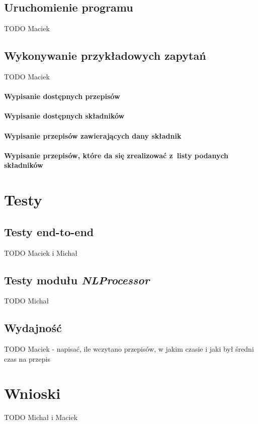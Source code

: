 \documentclass[11pt,a4paper]{article}
\begin{document}
\subsection{Uruchomienie programu}
TODO Maciek

\subsection{Wykonywanie przykładowych zapytań}
TODO Maciek
\paragraph{Wypisanie dostępnych przepisów}
\paragraph{Wypisanie dostępnych składników}
\paragraph{Wypisanie przepisów zawierających dany składnik}
\paragraph{Wypisanie przepisów, które da się zrealizować z~listy podanych składników}

\section{Testy}
\subsection{Testy end-to-end}
TODO Maciek i Michał

\subsection{Testy modułu \textit{NLProcessor}}
TODO Michał

\subsection{Wydajność}
TODO Maciek - napisać, ile wczytano przepisów, w jakim czasie i jaki był średni czas na przepis

\section{Wnioski}
TODO Michał i Maciek
\end{document}

